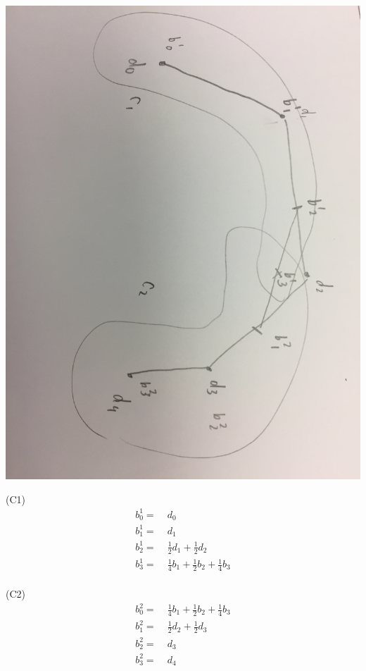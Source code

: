 \documentclass[12pt]{article}
\begin{document}
\includegraphics[scale=.1]{4Points}

(C1)
\begin{align*}
b^{1}_{0} =&\; d_0 \\
b^{1}_{1} =&\; d_1 \\
b^{1}_{2} =&\; \frac{1}{2} d_1 + \frac{1}{2}d_2 \\
b^{1}_{3} =&\; \frac{1}{4} b_1 + \frac{1}{2} b_2  + \frac{1}{4} b_3 \\
\end{align*}

(C2)
\begin{align*}
b^{2}_{0} =&\;\frac{1}{4} b_1 + \frac{1}{2} b_2  + \frac{1}{4} b_3\\
b^{2}_{1} =&\; \frac{1}{2} d_2 + \frac{1}{2}d_3 \\
b^{2}_{2} =&\; d_3 \\
b^{2}_{3} =&\; d_4 \\
\end{align*}
\end{document}
